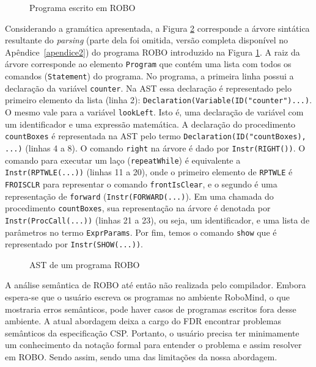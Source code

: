 \begin{figure}[!h]
\caption{Programa escrito em ROBO}

\label{fig:roboprogram}
\end{figure}

Considerando a gramática apresentada, a Figura \ref{fig:ast1} corresponde a árvore sintática resultante do \textit{parsing} (parte dela foi omitida, versão completa disponível no Apêndice~\ref{apendice2}) do programa ROBO introduzido na Figura \ref{fig:roboprogram}. A raiz da árvore corresponde ao elemento \texttt{Program} que contém uma lista com todos os comandos (\texttt{Statement}) do programa. No programa, a primeira linha possui a declaração da variável \texttt{counter}. Na AST essa declaração é representado pelo primeiro elemento da lista (linha 2): \texttt{Declaration(Variable(ID("counter")...)}. O mesmo vale para a variável \texttt{lookLeft}. Isto é, uma declaração de variável com um identificador e uma expressão matemática. A declaração do procedimento \texttt{countBoxes} é representada na AST pelo termo \texttt{Declaration(ID("countBoxes), ...)} (linhas 4 a 8). O comando \texttt{right} na árvore é dado por \texttt{Instr(RIGHT())}. O comando para executar um laço (\texttt{repeatWhile}) é equivalente a \texttt{Instr(RPTWLE(...))} (linhas 11 a 20), onde o primeiro elemento de \texttt{RPTWLE} é \texttt{FROISCLR} para representar o comando \texttt{frontIsClear}, e o segundo é uma representação de \texttt{forward} (\texttt{Instr(FORWARD(...)}). Em uma chamada do procedimento \texttt{countBoxes}, sua representação na árvore é denotada por \texttt{Instr(ProcCall(...))} (linhas 21 a 23), ou seja, um identificador, e uma lista de parâmetros no termo \texttt{ExprParams}. Por fim, temos o comando \texttt{show} que é representado por \texttt{Instr(SHOW(...))}.

\begin{figure}[!h]
\centering
\caption{AST de um programa ROBO}

\label{fig:ast1}
\end{figure}

A análise semântica de ROBO até então não realizada pelo compilador. Embora espera-se que o usuário escreva os programas no ambiente RoboMind, o que mostraria erros semânticos, pode haver casos de programas escritos fora desse ambiente. A atual abordagem deixa a cargo do FDR encontrar problemas semânticos da especificação CSP. Portanto, o usuário precisa ter minimamente um conhecimento da notação formal para entender o problema e assim resolver em ROBO. Sendo assim, sendo uma das limitações da nossa abordagem.

